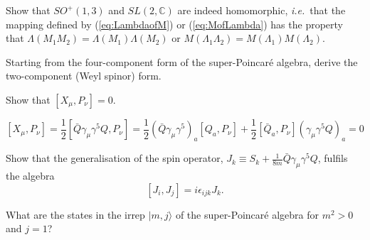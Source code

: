 \documentclass[notes.tex]{subfiles}
\begin{document}
\begin{Exercise}[]
Show that $SO^+(1,3)$ and $SL(2, \mathbb{C})$ are indeed homomorphic, {\it i.e.}\ that the mapping defined by (\ref{eq:LambdaofM}) or (\ref{eq:MofLambda}) has the property that $\Lambda(M_1M_2)=\Lambda(M_1)\Lambda(M_2)$ or $M(\Lambda_1\Lambda_2)=M(\Lambda_1)M(\Lambda_2)$.
\end{Exercise}


\begin{Exercise}[]
Starting from the four-component form of the super-Poincaré algebra, derive the two-component (Weyl spinor) form.
\end{Exercise}


\begin{Exercise}[]
Show that $[X_\mu,P_\nu]=0$.
\end{Exercise}

\begin{Answer} 
\[
[X_\mu,P_\nu]=\frac{1}{2}[\bar Q\gamma_\mu\gamma^5Q,P_\nu]=\frac{1}{2}(\bar Q\gamma_\mu\gamma^5)_a[Q_a,P_\nu]+\frac{1}{2}[\bar Q_a,P_\nu](\gamma_\mu\gamma^5Q)_a=0
\]
\end{Answer}

\begin{Exercise}[]
Show that the generalisation of the spin operator, $J_k\equiv S_k + \frac{1}{8m}\bar{Q}\gamma_\mu \gamma^5 Q$, fulfils the algebra
\[[J_i, J_j] = i\epsilon_{ijk}J_k.\]
\end{Exercise}

\begin{Exercise}[]
What are the states in the irrep $|m,j\rangle$ of the super-Poincaré algebra for $m^2>0$ and $j=1$?
\end{Exercise}
\end{document}
